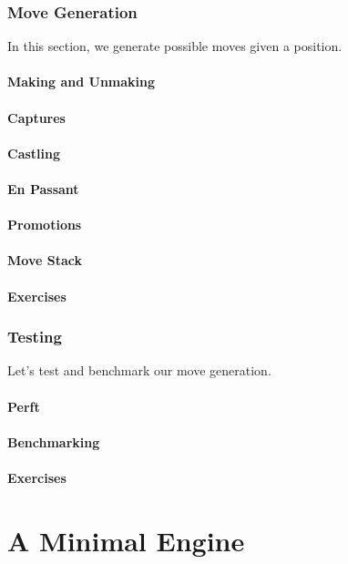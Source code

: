 \documentclass[letterpaper,11pt]{article}
\begin{document}
\section{Move Generation}

In this section, we generate possible moves given a position.

\subsection{Making and Unmaking}
\subsection{Captures}
\subsection{Castling}
\subsection{En Passant}
\subsection{Promotions}
\subsection{Move Stack}
\subsection{Exercises}

\section{Testing}

Let's test and benchmark our move generation.

\subsection{Perft}
\subsection{Benchmarking}
\subsection{Exercises}

\part{A Minimal Engine}
\end{document}

